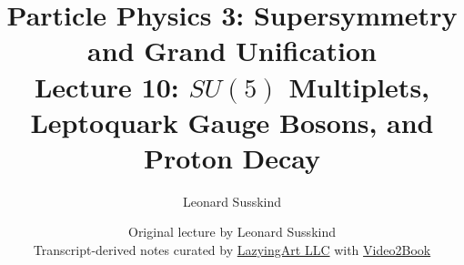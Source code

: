 \documentclass[11pt,oneside]{book}
\begin{document}
\frontmatter
\title{Particle Physics 3: Supersymmetry and Grand Unification\\[0.5em]
\large Lecture 10: \(SU(5)\) Multiplets, Leptoquark Gauge Bosons, and Proton Decay}
\author{Leonard Susskind}
\date{Original lecture by Leonard Susskind\\[0.4em]
Transcript-derived notes curated by
\href{https://lazying.art}{LazyingArt LLC} with
\href{https://github.com/lachlanchen/Video2Book}{Video2Book}}
\maketitle
\mainmatter

\end{document}
